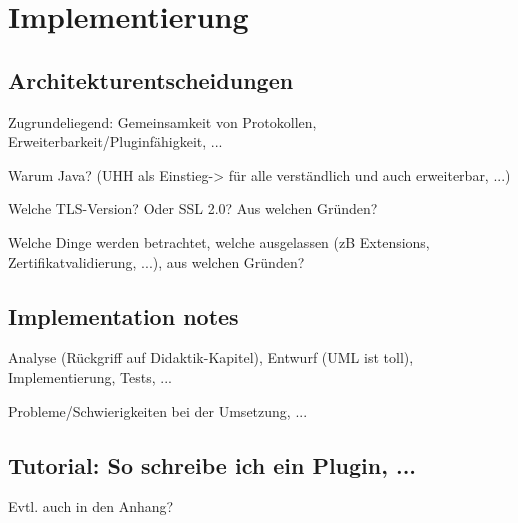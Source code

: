 \chapter{Implementierung}

\section{Architekturentscheidungen}

Zugrundeliegend: Gemeinsamkeit von Protokollen, Erweiterbarkeit/Pluginfähigkeit, ...

Warum Java? (UHH als Einstieg-> für alle verständlich und auch erweiterbar, ...)

Welche TLS-Version? Oder SSL 2.0? Aus welchen Gründen?

Welche Dinge werden betrachtet, welche ausgelassen (zB Extensions, Zertifikatvalidierung, ...), aus welchen Gründen?

\section{Implementation notes}

Analyse (Rückgriff auf Didaktik-Kapitel), Entwurf (UML ist toll), Implementierung, Tests, ...

Probleme/Schwierigkeiten bei der Umsetzung, ...

\section{Tutorial: So schreibe ich ein Plugin, ...}

Evtl. auch in den Anhang?
